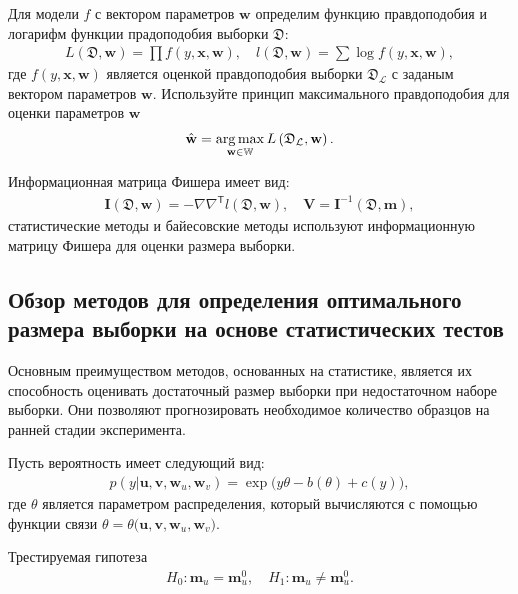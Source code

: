 Для модели $f$ с вектором параметров $\textbf{w}$ определим функцию правдоподобия и логарифм функции прадоподобия выборки $\mathfrak{D}$:
\[
\label{eq:ps:4}
\begin{aligned}
	L\left(\mathfrak{D}, \textbf{w}\right) = \prod f\left(y,\textbf{x}, \textbf{w}\right),\quad l\left(\mathfrak{D}, \textbf{w}\right) = \sum \log f\left(y,\textbf{x}, \textbf{w}\right),
\end{aligned}
\]
где $f(y,\textbf{x}, \textbf{w})$ является оценкой правдоподобия выборки $\mathfrak{D}_{\mathcal{L}}$ с заданым вектором параметров $\textbf{w}$.
Используйте принцип максимального правдоподобия для оценки параметров $\textbf{w}$
\[
\label{eq:ps:5}
\begin{aligned}
	\hat{\textbf{w}} = \operatorname*{arg\,max}_{\textbf{w}\in\mathbb{W}}L\left(\mathfrak{D}_{\mathcal{L}}, \textbf{w}\right).
\end{aligned}
\]

Информационная матрица Фишера имеет вид:
\[
\label{eq:ps:6}
\begin{aligned}
	\textbf{I}\left(\mathfrak{D}, \textbf{w}\right) = -\nabla\nabla^{\mathsf{T}}l\left(\mathfrak{D}, \textbf{w}\right), \quad  \textbf{V} = \textbf{I}^{-1}\left(\mathfrak{D}, \textbf{m}\right),
\end{aligned}
\]
статистические методы и байесовские методы используют информационную матрицу Фишера для оценки размера выборки.

\subsection{Обзор методов для определения оптимального размера выборки на основе статистических тестов}
Основным преимуществом методов, основанных на статистике, является их способность оценивать достаточный размер выборки при недостаточном наборе выборки. Они позволяют прогнозировать необходимое количество образцов на ранней стадии эксперимента.

Пусть вероятность имеет следующий вид:
\[
\label{eq:sb:1}
\begin{aligned}
	p(y|\textbf{u},\textbf{v},\textbf{w}_{u},\textbf{w}_{v}) = \exp\bigl(y\theta- b(\theta) + c\left(y\right)\bigr),
\end{aligned}
\]
где $\theta$ является параметром распределения, который вычисляются с помощью функции связи $\theta=\theta\bigr(\textbf{u},\textbf{v},\textbf{w}_{u},\textbf{w}_{v}\bigr)$.

Трестируемая гипотеза
\[
\label{eq:sb:2}
\begin{aligned}
	H_0: \textbf{m}_{u} = \textbf{m}^0_{u}, \quad H_1: \textbf{m}_{u} \not= \textbf{m}^0_{u}.
\end{aligned}
\]

